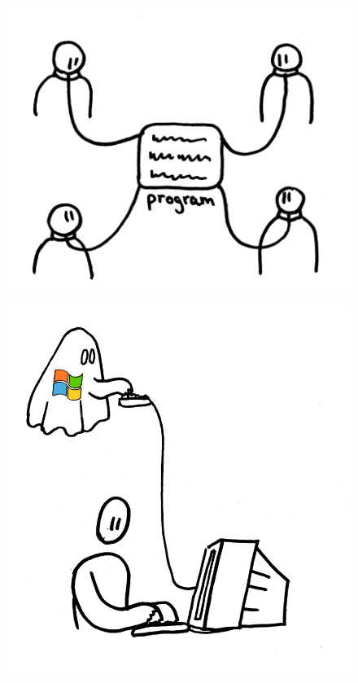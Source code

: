 \documentclass[notes,usenames,dvipsnames]{beamer}       %
\begin{document}
\begin{frame}
  \begin{figure}
    \centering
    \includegraphics[scale=0.4]{img/program-control-user}
  \end{figure}
\end{frame}

\begin{frame}
  \begin{figure}
    \centering
    \includegraphics[scale=0.8]{img/ms-comp}
  \end{figure}
\end{frame}
\end{document}
